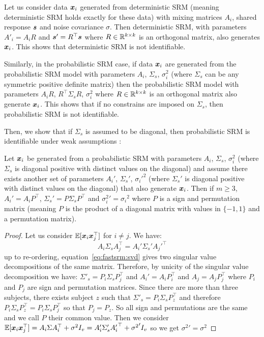 Let us consider data $\boldsymbol{x}_i$ generated from deterministic SRM (meaning
deterministic SRM holds exactly for these data) with
mixing matrices $A_i$, shared response $\boldsymbol{s}$ and noise covariance $\sigma$.
Then deterministic SRM, with parameters $A'_i = A_i R$ and $\boldsymbol{s}' = R^{\top} \boldsymbol{s}$ where
$R \in \mathbb{R}^{k \times k}$ is an orthogonal matrix, also
generates $\boldsymbol{x}_i$.
This shows that deterministic SRM is not identifiable.

Similarly, in the probabilistic SRM case, if data $\boldsymbol{x}_i$ are generated from the
probabilistic SRM model with 
parameters $A_i$, $\Sigma_s$, $\sigma_i^2$ (where $\Sigma_s$ can be any
symmetric positive definite
matrix) then the probabilistic SRM model with parameters $A_iR$, $R^{\top} \Sigma_s R$, $\sigma_i^2$  where
$R \in \mathbb{R}^{k \times k}$ is an orthogonal matrix also generate $\boldsymbol{x}_i$.
This shows that if no constrains are imposed on $\Sigma_s$,
then probabilistic SRM is not identifiable.


Then, we show that if $\Sigma_s$ is assumed to be diagonal, then probabilistic
SRM is identifiable under weak assumptions :
\begin{proposition}
  \label{prop:fastsrm:identifiability}
  Let $\boldsymbol{x}_i$ be generated from a probabilistic SRM with parameters 
  $A_i$, $\Sigma_s$, $\sigma_i^2$ (where $\Sigma_s$ is diagonal positive with
  distinct values on the diagonal) and assume there exists another set of parameters $A_i'$, $\Sigma_s'$,
  ${\sigma_i'}^2$ (where $\Sigma_s'$ is diagonal positive with
  distinct values on the diagonal) that also generate $\boldsymbol{x}_i$.
Then if $m\geq 3$, $A_i' = A_i P^{\top}$, $\Sigma_s'= P\Sigma_sP^{\top}$ and
  ${\sigma_i^2}' = {\sigma_i}^2$ where $P$ is a sign and permutation matrix
  (meaning $P$ is the product of a diagonal matrix with values in $\{-1, 1\}$
  and a permutation matrix).
\end{proposition}
\begin{proof}
  Let us consider $\mathbb{E}[\boldsymbol{x}_i \boldsymbol{x}_j^{\top}]$ for $i \neq j$.
  We have:
  \begin{equation}
  A_i \Sigma_s A_j^{\top} = A_i' \Sigma_s' {A_j'}^{\top}
  \label{eq:fastsrm:svd}
  \end{equation}
  up to re-ordering, equation~\eqref{eq:fastsrm:svd} gives two singular value
  decompositions of the same matrix.
  Therefore, by unicity of the singular value decomposition we have:
  $\Sigma'_s = P_i \Sigma_s P_j^{\top}$ and $A_i' = A_i P_i^{\top}$ and $A_j =
  A_j P_j^{\top}$ where $P_i$ and $P_j$ are sign and permutation matrices.
  Since there are more than three subjects, there exists subject $z$ such that
  $\Sigma'_s = P_i \Sigma_s P_z^{\top}$ and therefore
  $P_i \Sigma_s P_z^{\top} =  P_i \Sigma_s P_j^{\top}$ so that $P_j =
  P_z$. So all sign and permutations are the same and we call $P$ their
  common value.
  Then we consider
  $\mathbb{E}[\boldsymbol{x}_i \boldsymbol{x}_j^{\top}] = A_i \Sigma A_i^{\top} + \sigma^2 I_v = A_i' \Sigma_s'
  {A_i'}^{\top} + {\sigma^2}' I_v$
  so we get ${\sigma^2}' = {\sigma^2}$
\end{proof}

